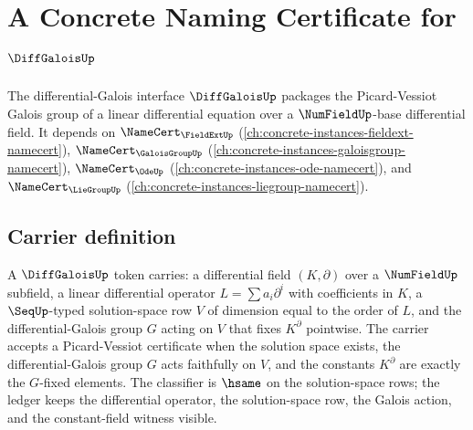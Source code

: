 \chapter{A Concrete Naming Certificate for $\DiffGaloisUp$}
\label{ch:concrete-instances-diffgalois-namecert}

The differential-Galois interface $\DiffGaloisUp$ packages the Picard-Vessiot Galois group of a linear differential equation over a $\NumFieldUp$-base differential field. It depends on $\NameCert_{\FieldExtUp}$ (\autoref{ch:concrete-instances-fieldext-namecert}), $\NameCert_{\GaloisGroupUp}$ (\autoref{ch:concrete-instances-galoisgroup-namecert}), $\NameCert_{\OdeUp}$ (\autoref{ch:concrete-instances-ode-namecert}), and $\NameCert_{\LieGroupUp}$ (\autoref{ch:concrete-instances-liegroup-namecert}).

\section{Carrier definition}
\label{sec:diffgalois-carrier}

A $\DiffGaloisUp$ token carries: a differential field $(K,\partial)$ over a $\NumFieldUp$ subfield, a linear differential operator $L=\sum a_i\partial^i$ with coefficients in $K$, a $\SeqUp$-typed solution-space row $V$ of dimension equal to the order of $L$, and the differential-Galois group $G$ acting on $V$ that fixes $K^\partial$ pointwise. The carrier accepts a Picard-Vessiot certificate when the solution space exists, the differential-Galois group $G$ acts faithfully on $V$, and the constants $K^\partial$ are exactly the $G$-fixed elements. The classifier is $\hsame$ on the solution-space rows; the ledger keeps the differential operator, the solution-space row, the Galois action, and the constant-field witness visible.

